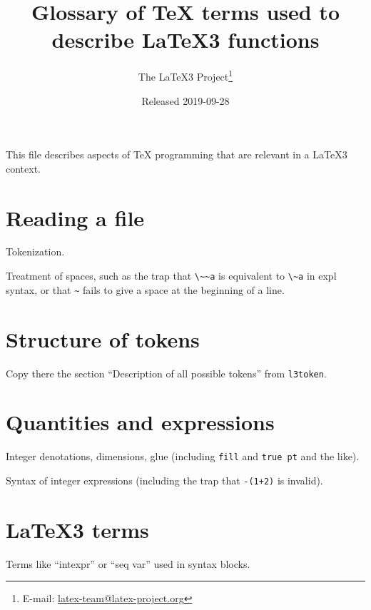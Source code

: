 \documentclass{l3doc}
\title{%
  Glossary of \TeX{} terms used to describe \LaTeX3 functions%
}
\author{%
  The \LaTeX3 Project\thanks
    {%
      E-mail:
      \href{mailto:latex-team@latex-project.org}%
        {latex-team@latex-project.org}%
    }%
}
\date{Released 2019-09-28}
\begin{document}
\maketitle

This file describes aspects of \TeX{} programming that are relevant in a
\LaTeX3 context.

\section{Reading a file}

Tokenization.

Treatment of spaces, such as the trap that \verb|\~~a| is equivalent to
\verb|\~a| in expl syntax, or that \verb|~| fails to give a space at the
beginning of a line.

\section{Structure of tokens}

Copy there the section ``Description of all possible tokens'' from \texttt{l3token}.

\section{Quantities and expressions}

Integer denotations, dimensions, glue (including \texttt{fill} and \texttt{true pt} and the like).

Syntax of integer expressions (including the trap that \verb|-(1+2)| is invalid).

\section{\LaTeX3 terms}

Terms like ``intexpr'' or ``seq var'' used in syntax blocks.
\end{document}
